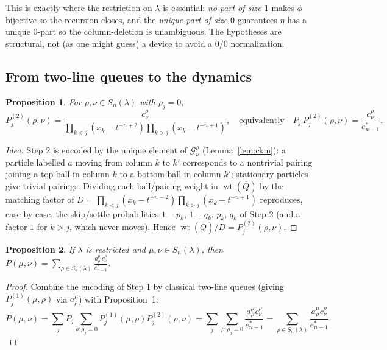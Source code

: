 \documentclass[11pt]{article}
\newcommand{\Snl}{S_n(\lambda)}
\newcommand{\wt}{\operatorname{wt}}
\newtheorem{proposition}{Proposition}
\theoremstyle{definition}
\begin{document}
This is exactly where the restriction on $\lambda$ is essential: \emph{no part of
size $1$} makes $\phi$ bijective so the recursion closes, and the \emph{unique
part of size $0$} guarantees $\eta$ has a unique $0$-part so the column-deletion
is unambiguous. The hypotheses are structural, not (as one might guess) a device
to avoid a $0/0$ normalization.

\subsection*{From two-line queues to the dynamics}

\begin{proposition}\label{prop:step2}
For $\rho,\nu\in\Snl$ with $\rho_j=0$,
\[
P^{(2)}_j(\rho,\nu)=\frac{c^\rho_\nu}{\prod_{k<j}(x_k-t^{-n+2})\prod_{k>j}(x_k-t^{-n+1})},
\quad\text{equivalently}\quad
P_j\,P^{(2)}_j(\rho,\nu)=\frac{c^\rho_\nu}{e^*_{n-1}} .
\]
\end{proposition}

\begin{proof}[Idea]
Step 2 is encoded by the unique element of $\mathcal G^\rho_\nu$ (Lemma~\ref{lem:ckm}):
a particle labelled $a$ moving from column $k$ to $k'$ corresponds to a
nontrivial pairing joining a top ball in column $k$ to a bottom ball in column
$k'$; stationary particles give trivial pairings. Dividing each ball/pairing
weight in $\wt(\overline Q)$ by the matching factor of
$D=\prod_{k<j}(x_k-t^{-n+2})\prod_{k>j}(x_k-t^{-n+1})$ reproduces, case by case,
the skip/settle probabilities $1-p_k,\,1-q_k,\,p_k,\,q_k$ of Step 2 (and a
factor $1$ for $k>j$, which never moves). Hence $\wt(\overline Q)/D=P^{(2)}_j(\rho,\nu)$.
\end{proof}

\begin{proposition}\label{prop:transition}
If $\lambda$ is restricted and $\mu,\nu\in\Snl$, then
$\displaystyle P(\mu,\nu)=\sum_{\rho\in\Snl}\frac{a^\mu_\rho\,c^\rho_\nu}{e^*_{n-1}}$.
\end{proposition}

\begin{proof}
Combine the encoding of Step 1 by classical two-line queues
\cite[Lem.~5.4]{AMW25} (giving $P^{(1)}_j(\mu,\rho)$ via $a^\mu_\rho$) with
Proposition~\ref{prop:step2}:
\[
P(\mu,\nu)=\sum_j P_j\!\!\sum_{\rho:\rho_j=0}\!P^{(1)}_j(\mu,\rho)P^{(2)}_j(\rho,\nu)
=\sum_j\sum_{\rho:\rho_j=0}\frac{a^\mu_\rho c^\rho_\nu}{e^*_{n-1}}
=\sum_{\rho\in\Snl}\frac{a^\mu_\rho c^\rho_\nu}{e^*_{n-1}}.
\]
\end{proof}
\end{document}
